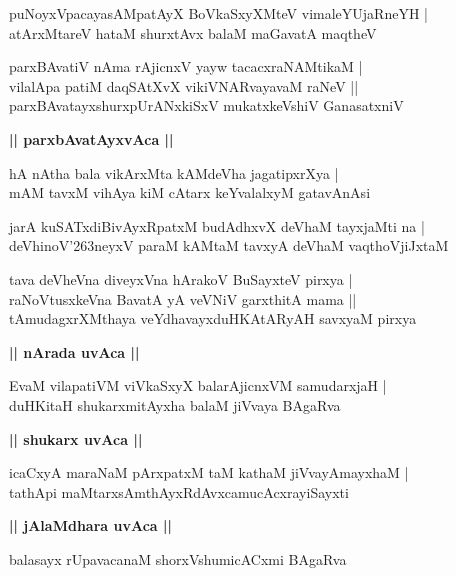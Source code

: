 \documentclass[twoside,12pt,openright]{book}
\def\S{\char'263}
\newcounter{shloka}[chapter]
\def\uvaca#1{\centerline{{\large\textbf{#1}}}}
\begin{document}
\begin{shloka}%
puNoyxVpacayasAMpatAyX BoVkaSxyXMteV vimaleYUjaRneYH |\\
atArxMtareV hataM shurxtAvx balaM maGavatA maqtheV 
\end{shloka}

\begin{shloka}%
parxBAvatiV nAma rAjicnxV yayw tacacxraNAMtikaM |\\
vilalApa patiM daqSAtXvX vikiVNARvayavaM raNeV ||\\
parxBAvatayxshurxpUrANxkiSxV mukatxkeVshiV GanasatxniV 
\end{shloka}

\uvaca{|| parxbAvatAyxvAca ||}

\begin{shloka}%
hA nAtha bala vikArxMta kAMdeVha jagatipxrXya |\\
mAM tavxM vihAya kiM cAtarx keYvalalxyM gatavAnAsi 
\end{shloka}

\begin{shloka}%
jarA kuSATxdiBivAyxRpatxM budAdhxvX deVhaM tayxjaMti na |\\
deVhinoV\S neyxV paraM kAMtaM tavxyA deVhaM vaqthoVjiJxtaM 
\end{shloka}

\begin{shloka}%
tava deVheVna diveyxVna hArakoV BuSayxteV pirxya |\\
raNoVtusxkeVna BavatA yA veVNiV garxthitA mama ||\\
tAmudagxrXMthaya veYdhavayxduHKAtARyAH savxyaM pirxya
\end{shloka}

\uvaca{|| nArada uvAca ||}

\begin{shloka}%
EvaM vilapatiVM viVkaSxyX balarAjicnxVM samudarxjaH |\\
duHKitaH shukarxmitAyxha balaM jiVvaya BAgaRva 
\end{shloka}

\uvaca{|| shukarx uvAca ||}

\begin{shloka}%
icaCxyA maraNaM pArxpatxM taM kathaM jiVvayAmayxhaM |\\
tathApi maMtarxsAmthAyxRdAvxcamucAcxrayiSayxti 
\end{shloka}

\uvaca{|| jAlaMdhara uvAca ||}

\begin{shloka}%
balasayx rUpavacanaM shorxVshumicACxmi BAgaRva
\end{shloka}
\end{document}
